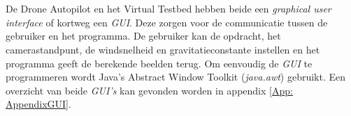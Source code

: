 \\
\\
De Drone Autopilot en het Virtual Testbed hebben beide een \textit{graphical user interface} of kortweg een \textit{GUI}. Deze zorgen voor de communicatie tussen de gebruiker en het programma. De gebruiker kan de opdracht, het camerastandpunt, de windsnelheid en gravitatieconstante instellen en het programma geeft de berekende beelden terug. Om eenvoudig de \textit{GUI} te programmeren wordt Java's Abstract Window Toolkit (\textit{java.awt}) gebruikt. Een overzicht van beide \textit{GUI's} kan gevonden worden in appendix \ref{App: AppendixGUI}.

